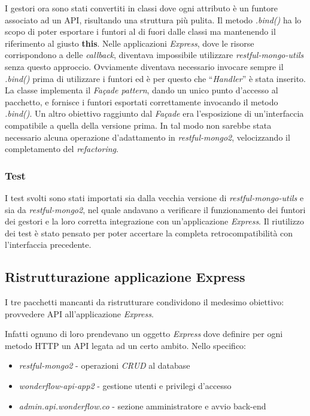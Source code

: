 I gestori ora sono stati convertiti in classi dove ogni attributo è un funtore
associato ad un \gls{API}, risultando una struttura più pulita. Il metodo
\textit{.bind()} ha lo scopo di poter esportare i funtori al di fuori dalle
classi ma mantenendo il riferimento al giusto \textbf{this}. Nelle applicazioni
\textit{Express}, dove le risorse corrispondono a delle \textit{callback},
diventava impossibile utilizzare \textit{restful-mongo-utils} senza questo
approccio. Ovviamente diventava necessario invocare sempre il \textit{.bind()}
prima di utilizzare i funtori ed è per questo che ``\textit{Handler}'' è stata
inserito. La classe implementa il \textit{Façade pattern}, dando un unico punto
d'accesso al pacchetto, e fornisce i funtori esportati correttamente invocando
il metodo \textit{.bind()}. Un altro obiettivo raggiunto dal \textit{Façade} era
l'esposizione di un'interfaccia compatibile a quella della versione prima.
In tal modo non sarebbe stata necessario alcuna operazione d'adattamento in
\textit{restful-mongo2}, velocizzando il completamento del \textit{refactoring}.

\subsubsection{Test}
I test svolti sono stati importati sia dalla vecchia versione di
\textit{restful-mongo-utils} e sia da \textit{restful-mongo2}, nel quale
andavano a verificare il funzionamento dei funtori dei gestori e la loro
corretta integrazione con un'applicazione \textit{Express}. Il riutilizzo dei
test è stato pensato per poter accertare la completa retrocompatibilità con
l'interfaccia precedente.

\subsection{Ristrutturazione applicazione Express}
I tre pacchetti mancanti da ristrutturare condividono il medesimo obiettivo:
provvedere \gls{API} all'applicazione \textit{Express}.

Infatti ognuno di loro prendevano un oggetto \textit{Express} dove definire per
ogni metodo HTTP un \gls{API} legata ad un certo ambito. Nello specifico:
\begin{itemize}
\item \textit{restful-mongo2} - operazioni \textit{CRUD} al database
\item \textit{wonderflow-api-app2} - gestione utenti e privilegi d'accesso
\item \textit{admin.api.wonderflow.co} - sezione amministratore e avvio
\gls{back-end}
\end{itemize}


